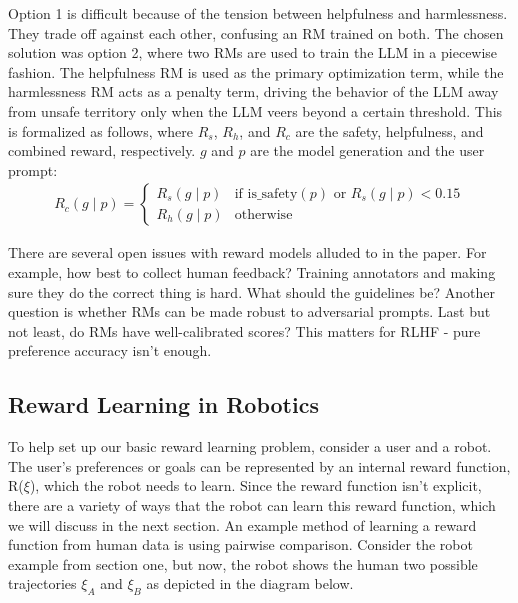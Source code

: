 \documentclass[
  letterpaper,
  numbers=noenddot,
  DIV=11]{scrreprt}
\theoremstyle{definition}
\theoremstyle{plain}
\theoremstyle{plain}
\theoremstyle{remark}
\begin{document}
Option 1 is difficult because of the tension between helpfulness and
harmlessness. They trade off against each other, confusing an RM trained
on both. The chosen solution was option 2, where two RMs are used to
train the LLM in a piecewise fashion. The helpfulness RM is used as the
primary optimization term, while the harmlessness RM acts as a penalty
term, driving the behavior of the LLM away from unsafe territory only
when the LLM veers beyond a certain threshold. This is formalized as
follows, where \(R_s\), \(R_h\), and \(R_c\) are the safety,
helpfulness, and combined reward, respectively. \(g\) and \(p\) are the
model generation and the user prompt: \[\begin{aligned}
    R_c(g \mid p) =
    \begin{cases}
        R_s(g \mid p) & \text{if } \text{is\_safety}(p) \text{ or } R_s(g \mid p) < 0.15 \\
        R_h(g \mid p) & \text{otherwise}
    \end{cases}
\end{aligned}\]

There are several open issues with reward models alluded to in the
paper. For example, how best to collect human feedback? Training
annotators and making sure they do the correct thing is hard. What
should the guidelines be? Another question is whether RMs can be made
robust to adversarial prompts. Last but not least, do RMs have
well-calibrated scores? This matters for RLHF - pure preference accuracy
isn't enough.

\subsection{Reward Learning in
Robotics}\label{reward-learning-in-robotics}

To help set up our basic reward learning problem, consider a user and a
robot. The user's preferences or goals can be represented by an internal
reward function, R(\(\xi\)), which the robot needs to learn. Since the
reward function isn't explicit, there are a variety of ways that the
robot can learn this reward function, which we will discuss in the next
section. An example method of learning a reward function from human data
is using pairwise comparison. Consider the robot example from section
one, but now, the robot shows the human two possible trajectories
\(\xi_A\) and \(\xi_B\) as depicted in the diagram below.
\end{document}
